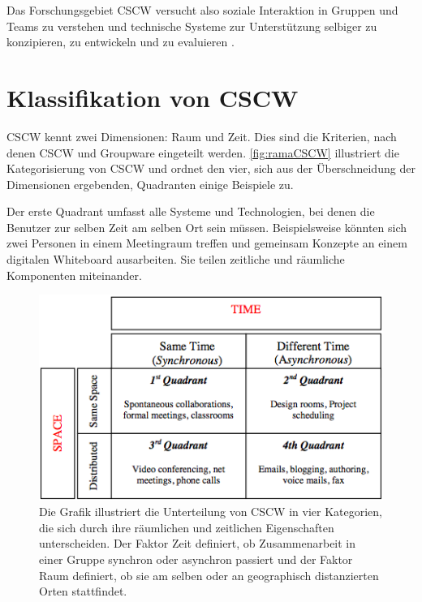 	Das Forschungsgebiet \ac{CSCW} versucht also soziale Interaktion in Gruppen und Teams zu verstehen und technische Systeme zur Unterstützung selbiger zu konzipieren, zu entwickeln und zu evaluieren \citep{Koch2008}.

\section{Klassifikation von CSCW} 

\ac{CSCW} kennt zwei Dimensionen: Raum und Zeit. Dies sind die Kriterien, nach denen \ac{CSCW} und Groupware eingeteilt werden. \autoref{fig:ramaCSCW} illustriert die Kategorisierung von \ac{CSCW} und ordnet den vier, sich aus der Überschneidung der Dimensionen ergebenden, Quadranten einige Beispiele zu. 

Der erste Quadrant umfasst alle Systeme und Technologien, bei denen die Benutzer zur selben Zeit am selben Ort sein müssen. Beispielsweise könnten sich zwei Personen in einem Meetingraum treffen und gemeinsam Konzepte an einem digitalen Whiteboard ausarbeiten. Sie teilen zeitliche und räumliche Komponenten miteinander. 

\begin{figure}
	\includegraphics[width=\textwidth]{gfx/ramaCSCWQuadranten.png}
	\caption[CSCW-Kategorien \newline \citep{Rama:2006p245}]{Die Grafik illustriert die Unterteilung von CSCW in vier Kategorien, die sich durch ihre räumlichen und zeitlichen Eigenschaften unterscheiden. Der Faktor Zeit definiert, ob Zusammenarbeit in einer Gruppe synchron oder asynchron passiert und der Faktor Raum definiert, ob sie am selben oder an geographisch distanzierten Orten stattfindet.}
	\label{fig:ramaCSCW}
\end{figure}

